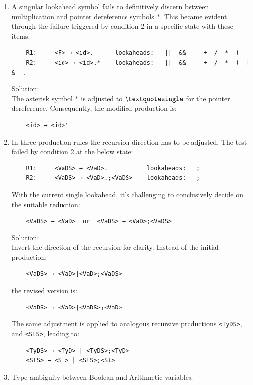 \begin{enumerate}
    \item A singular lookahead symbol fails to definitively discern between multiplication and pointer dereference symbols \(\ast\). This became evident through the failure triggered by condition 2 in a specific state with these items:
    \begin{verbatim}
    R1:     <F> → <id>.      lookaheads:   ||  &&  -  +  /  *  )
    R2:     <id> → <id>.*    lookaheads:   ||  &&  -  +  /  *  )  [  &  .
    \end{verbatim}
    Solution: \\
    The asterisk symbol \(\ast\) is adjusted to \(\textquotesingle\) for the pointer dereference. Consequently, the modified production is:
    \begin{verbatim}
    <id> → <id>'
    \end{verbatim}

    \item In three production rules the recursion direction has to be adjusted.
    The test failed by condition 2 at the below state:
    \begin{verbatim}
    R1:     <VaDS> → <VaD>.           lookaheads:   ;
    R2:     <VaDS> → <VaD>.;<VaDS>    lookaheads:   ;
    \end{verbatim}
    With the current single lookahead, it’s challenging to conclusively decide on the suitable reduction:
    \begin{verbatim}
    <VaDS> ← <VaD>  or  <VaDS> ← <VaD>;<VaDS>
    \end{verbatim}

    Solution: \\
    Invert the direction of the recursion for clarity. Instead of the initial production:
    \begin{verbatim}
    <VaDS> → <VaD>|<VaD>;<VaDS>
    \end{verbatim}
    the revised version is:
    \begin{verbatim}
    <VaDS> → <VaD>|<VaDS>;<VaD>
    \end{verbatim}

    The same adjustment is applied to analogous recursive productions \texttt{<TyDS>}, and \texttt{<StS>}, leading to:
    \begin{verbatim}
    <TyDS> → <TyD> | <TyDS>;<TyD>
    <StS> → <St> | <StS>;<St>
    \end{verbatim}

    \item Type ambiguity between Boolean and Arithmetic variables.


\end{enumerate}
